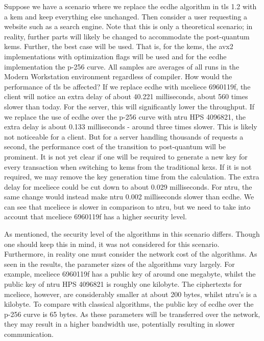 Suppose we have a scenario where we replace the \gls{ecdhe} algorithm in \gls{tls} 1.2 with a \gls{kem} and keep everything else unchanged. Then consider a user requesting a website such as a search engine. Note that this is only a theoretical scenario; in reality, further parts will likely be changed to accommodate the \gls{post-quantum} \glspl{kem}. Further, the best case will be used. That is, for the \glspl{kem}, the \gls{avx2} implementations with optimization flags will be used and for the \gls{ecdhe} implementation the \gls{p-256} curve. All samples are averages of all runs in the Modern Workstation environment regardless of compiler. How would the performance of \gls{tls} be affected? If we replace \gls{ecdhe} with \gls{mceliece} 6960119f, the client will notice an extra delay of about 40.221 milliseconds, about 560 times slower than today. For the server, this will significantly lower the throughput. If we replace the use of \gls{ecdhe} over the \gls{p-256} curve with \gls{ntru} HPS 4096821, the extra delay is about 0.133 milliseconds - around three times slower. This is likely not noticeable for a client. But for a server handling thousands of requests a second, the performance cost of the transition to \gls{post-quantum} will be prominent. It is not yet clear if one will be required to generate a new key for every transaction when switching to \glspl{kem} from the traditional \glspl{kex}. If it is not required, we may remove the key generation time from the calculation. The extra delay for \gls{mceliece} could be cut down to about 0.029 milliseconds. For \gls{ntru}, the same change would instead make \gls{ntru} 0.002 milliseconds slower than \gls{ecdhe}. We can see that \gls{mceliece} is slower in comparison to \gls{ntru}, but we need to take into account that \gls{mceliece} 6960119f has a higher security level.

As mentioned, the security level of the algorithms in this scenario differs. Though one should keep this in mind, it was not considered for this scenario. Furthermore, in reality one must consider the network cost of the algorithms. As seen in the results, the parameter sizes of the algorithms vary largely. For example, \gls{mceliece} 6960119f has a public key of around one megabyte, whilst the public key of \gls{ntru} HPS 4096821 is roughly one kilobyte. The ciphertexts for \gls{mceliece}, however, are considerably smaller at about 200 bytes, whilst \gls{ntru}'s is a kilobyte. To compare with classical algorithms, the public key of \gls{ecdhe} over the \gls{p-256} curve is 65 bytes. As these parameters will be transferred over the network, they may result in a higher bandwidth use, potentially resulting in slower communication.

